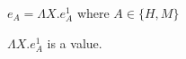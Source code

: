 \begin{case}

$e_{A}=\Lambda X.e_{A}^{1}$ where $A\in\lbrace H,M\rbrace$

$\Lambda X.e_{A}^{1}$ is a value.

\end{case}